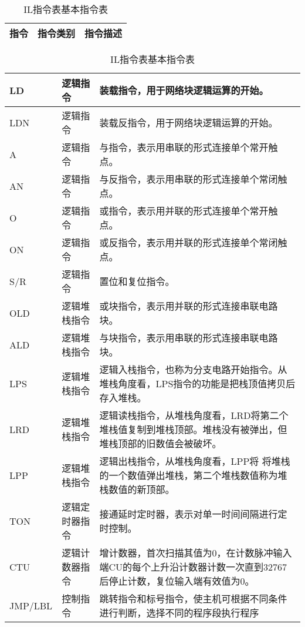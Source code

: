 \begin{table}[!htp]
\centering
\caption{IL指令表基本指令表}
\label{spec:il}
\begin{tabular}{|p{2cm}<{\centering}|p{3cm}<{\centering}|p{8cm}<{\centering}|}
\hline
指令 & 指令类别 & 指令描述 \\
\hline
\end{tabular}
\begin{tabular}{|p{2cm}|p{3cm}|p{8cm}|}
\hline
LD & 逻辑指令 & 装载指令，用于网络块逻辑运算的开始。 \\
\hline
LDN & 逻辑指令 & 装载反指令，用于网络块逻辑运算的开始。 \\
\hline
A & 逻辑指令 & 与指令，表示用串联的形式连接单个常开触点。 \\
\hline
AN & 逻辑指令 & 与反指令，表示用串联的形式连接单个常闭触点。 \\
\hline
O & 逻辑指令 & 或指令，表示用并联的形式连接单个常开触点。 \\
\hline
ON & 逻辑指令 & 或反指令，表示用并联的形式连接单个常闭触点。 \\
\hline
S/R & 逻辑指令 & 置位和复位指令。 \\
\hline
OLD & 逻辑堆栈指令 & 或块指令，表示用并联的形式连接串联电路块。 \\
\hline
ALD & 逻辑堆栈指令 & 与块指令，表示用串联的形式连接串联电路块。 \\
\hline
LPS & 逻辑堆栈指令 & 逻辑入栈指令，也称为分支电路开始指令。从堆栈角度看，LPS指令的功能是把栈顶值拷贝后存入堆栈。\\
\hline
LRD & 逻辑堆栈指令 & 逻辑读栈指令，从堆栈角度看，LRD将第二个堆栈值复制到堆栈顶部。堆栈没有被弹出，但堆栈顶部的旧数值会被破坏。
\\
\hline
LPP & 逻辑堆栈指令 & 逻辑出栈指令，从堆栈角度看，LPP将
将堆栈的一个数值弹出堆栈，第二个堆栈数值称为堆栈数值的新顶部。\\
\hline
TON & 逻辑定时器指令 & 接通延时定时器，表示对单一时间间隔进行定时控制。 \\
\hline
CTU & 逻辑计数器指令 & 增计数器，首次扫描其值为0，在计数脉冲输入端CU的每个上升沿计数器计数一次直到32767后停止计数，复位输入端有效值为0。 \\
\hline
JMP/LBL & 控制指令 & 跳转指令和标号指令，使主机可根据不同条件进行判断，选择不同的程序段执行程序 \\
\hline

\end{tabular}
\end{table}

